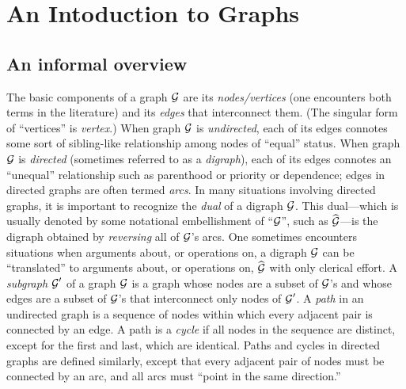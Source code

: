 \section{An Intoduction to Graphs}
\label{sec:Graph-general}

\subsection{An informal overview}
\label{sec:graphs-informal}

The basic components of a graph $\mbox{$\cal G$}$ are its {\em nodes/vertices}
  
 (one encounters both terms in the
literature) and its {\em edges}   that interconnect them.  (The singular form of ``vertices''
is {\it vertex}.)   
When graph $\mbox{$\cal G$}$ is {\em undirected},  each of
its edges connotes some sort of sibling-like relationship among nodes
of ``equal'' status.  When graph $\mbox{$\cal G$}$ is {\em directed}
 (sometimes referred to as a {\em digraph}),
  each of its edges connotes an
``unequal'' relationship such as parenthood or priority or dependence;
edges in directed graphs are often termed {\em
  arcs}.  
 In many situations involving directed
graphs, it is important to recognize the {\em dual}
 of a digraph $\mbox{$\cal G$}$.  This dual---which is
usually denoted by some notational embellishment of ``$\mbox{$\cal G$}$'', such as
$\widehat{\mbox{$\cal G$}}$---is the digraph obtained by {\em reversing} all of
$\mbox{$\cal G$}$'s arcs.  One sometimes encounters situations when arguments
about, or operations on, a digraph $\mbox{$\cal G$}$ can be ``translated'' to
arguments about, or operations on, $\widehat{\mbox{$\cal G$}}$ with only clerical
effort.  A {\em subgraph} $\mbox{$\cal G$}'$ of a graph $\mbox{$\cal G$}$ is a graph whose nodes
are a subset of $\mbox{$\cal G$}$'s and whose edges are a subset of $\mbox{$\cal G$}$'s that
interconnect only nodes of $\mbox{$\cal G$}'$.  A {\em path} 
 in an undirected graph is a sequence of
nodes within which every adjacent pair is connected by an edge.  A
path is a {\em cycle}  
if all nodes in the sequence are distinct, except for the first and
last, which are identical.  Paths and cycles in directed graphs are
defined similarly, except that every adjacent pair of nodes must be
connected by an arc, and all arcs must ``point in the same
direction.''

